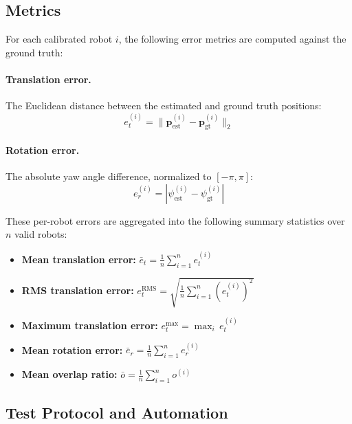 \subsection{Metrics}
\label{sec:metrics}

For each calibrated robot $i$, the following error metrics are computed
against the ground truth:

\paragraph{Translation error.}
The Euclidean distance between the estimated and ground truth positions:
\begin{equation}
    e_t^{(i)} = \lVert \mathbf{p}_\mathrm{est}^{(i)}
                      - \mathbf{p}_\mathrm{gt}^{(i)} \rVert_2
\end{equation}

\paragraph{Rotation error.}
The absolute yaw angle difference, normalized to $[-\pi, \pi]$:
\begin{equation}
    e_r^{(i)} = \left| \psi_\mathrm{est}^{(i)}
                     - \psi_\mathrm{gt}^{(i)} \right|
\end{equation}

These per-robot errors are aggregated into the following summary
statistics over $n$ valid robots:
\begin{itemize}
    \item \textbf{Mean translation error:}
          $\bar{e}_t = \frac{1}{n} \sum_{i=1}^{n} e_t^{(i)}$
    \item \textbf{RMS translation error:}
          $e_t^\mathrm{RMS} = \sqrt{\frac{1}{n} \sum_{i=1}^{n}
          (e_t^{(i)})^2}$
    \item \textbf{Maximum translation error:}
          $e_t^\mathrm{max} = \max_i \, e_t^{(i)}$
    \item \textbf{Mean rotation error:}
          $\bar{e}_r = \frac{1}{n} \sum_{i=1}^{n} e_r^{(i)}$
    \item \textbf{Mean overlap ratio:}
          $\bar{o} = \frac{1}{n} \sum_{i=1}^{n} o^{(i)}$
\end{itemize}

\subsection{Test Protocol and Automation}
\label{sec:test_protocol}

